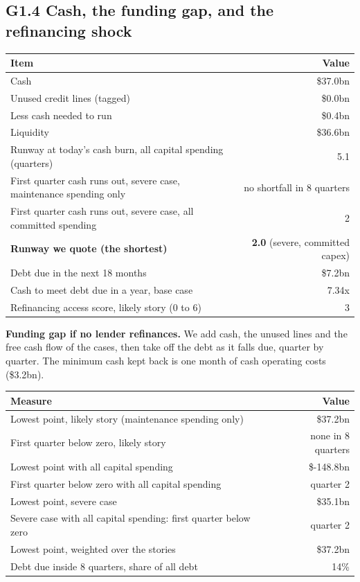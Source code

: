 \documentclass[11pt,a4paper]{article}
\begin{document}
\subsection*{G1.4 Cash, the funding gap, and the refinancing shock}
\begin{center}\footnotesize\setlength{\tabcolsep}{3.5pt}\begin{tabular}{@{}lr@{}}\toprule
Item & Value \\\midrule
Cash & \$37.0bn \\
Unused credit lines (tagged) & \$0.0bn \\
Less cash needed to run & \$0.4bn \\
Liquidity & \$36.6bn \\
Runway at today's cash burn, all capital spending (quarters) & 5.1 \\
First quarter cash runs out, severe case, maintenance spending only & no shortfall in 8 quarters \\
First quarter cash runs out, severe case, all committed spending & 2 \\
\textbf{Runway we quote (the shortest)} & \textbf{2.0} (severe, committed capex) \\
Debt due in the next 18 months & \$7.2bn \\
Cash to meet debt due in a year, base case & 7.34x \\
Refinancing access score, likely story (0 to 6) & 3 \\
\bottomrule\end{tabular}\end{center}
\textbf{Funding gap if no lender refinances.} We add cash, the unused lines and the free cash flow of the cases, then take off the debt as it falls due, quarter by quarter. The minimum cash kept back is one month of cash operating costs (\$3.2bn).
\begin{center}\footnotesize\setlength{\tabcolsep}{3.5pt}\begin{tabular}{@{}lr@{}}\toprule
Measure & Value \\\midrule
Lowest point, likely story (maintenance spending only) & \$37.2bn \\
First quarter below zero, likely story & none in 8 quarters \\
Lowest point with all capital spending & \$-148.8bn \\
First quarter below zero with all capital spending & quarter 2 \\
Lowest point, severe case & \$35.1bn \\
Severe case with all capital spending: first quarter below zero & quarter 2 \\
Lowest point, weighted over the stories & \$37.2bn \\
Debt due inside 8 quarters, share of all debt & 14\% \\
\bottomrule\end{tabular}\end{center}
\end{document}
